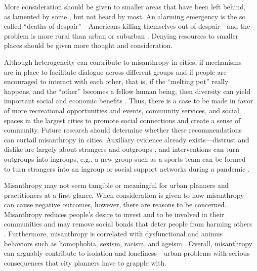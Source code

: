 \documentclass[11pt, letterpaper]{article}
\begin{document}
\begin{spacing}{1.4}
 More consideration should be given to smaller areas that have been left behind, as lamented by some
\citep[e.g.,][]{fullerNYT17monD,hansonCityJournalautumn15}, but not heard by
most.
 An alarming emergency is the so called ``deaths of despair''---Americans killing themselves out of despair---and the problem is more rural than urban or suburban \citep{case15,case20}.
Denying resources to smaller places should be given more thought and consideration.
 
Although heterogeneity can contribute to misanthropy in cities, if mechanisms
are in place to facilitate dialogue across different groups and if people are
encouraged to interact with each other, that is, if the ``melting pot'' really
happens, and the ``other'' becomes a fellow human being, then diversity can
yield important social and economic benefits \citep{rodriguez2019does}.  
Thus, there is a case to be made in favor of more recreational opportunities and events, community services, and social spaces in the largest cities to promote social connections and create a sense of community.  Future research should determine whether these recommendations can curtail misanthropy in
cities. Auxiliary evidence already exists---distrust and dislike are largely about strangers and outgroups \citep{wilson85, delhey11}, and interventions can turn outgroups into ingroups, e.g., a new group such as a sports team can be formed to turn strangers into an ingroup or social support networks during a pandemic \citep[e.g.,][]{smith10}.

Misanthropy may not seem tangible or meaningful for urban planners and practitioners at a first glance.  When consideration is given to how misanthropy can cause negative outcomes, however, there are reasons to be concerned. Misanthropy reduces people's desire to invest and to be involved in their communities and may remove social bonds that deter people from harming others \citep{weaver2006,hirschi1993,fafchamps2006,walters2013}. Furthermore, misanthropy is correlated with dysfunctional and animus behaviors such as
 homophobia, sexism, racism, and ageism \citep{cattacin2006}. Overall, misanthropy can arguably contribute to isolation and loneliness---urban problems with serious consequences that city planners have to grapple with. 
 

\end{spacing}
\end{document}
